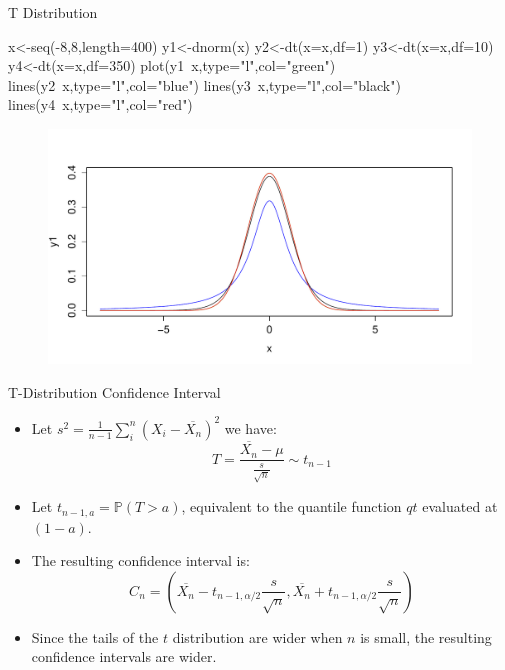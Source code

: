\documentclass[handout]{beamer}
\begin{document}
\begin{frame}[fragile]{T Distribution}
 \scriptsize{



\begin{verbatim*}
x<-seq(-8,8,length=400)
y1<-dnorm(x)
y2<-dt(x=x,df=1)
y3<-dt(x=x,df=10)
y4<-dt(x=x,df=350)
plot(y1~x,type="l",col="green")
lines(y2~x,type="l",col="blue")
lines(y3~x,type="l",col="black")
lines(y4~x,type="l",col="red")

\end{verbatim*}

 \begin{figure}[h!]
	\centering
	\includegraphics[scale=0.3]{pics/tstudent.pdf}
\end{figure}


}
\end{frame}


\begin{frame}{T-Distribution Confidence Interval}

\scriptsize{
\begin{itemize}
 \item Let  $s^{2}= \frac{1}{n-1} \sum_{i}^{n}(X_{i}-\overline{X_{n}})^2$ we have:
 \begin{displaymath}
  T=\frac{\overline{X_{n}}-\mu}{\frac{s}{\sqrt{n}}}\sim t_{n-1}
 \end{displaymath}
\item  Let $t_{n-1,a}=\mathbb{P}(T>a)$, equivalent to the quantile function $qt$ evaluated at $(1-a)$.
\item The resulting confidence interval is:
       \begin{displaymath}
 C_n = (\overline{X_{n}}-t_{n-1,\alpha/2}\frac{s}{\sqrt{n}} , \overline{X_{n}} + t_{n-1,\alpha/2}\frac{s}{\sqrt{n}}) 
 \end{displaymath} 
 \item Since the tails of the $t$ distribution are wider when $n$ is small, the resulting confidence intervals are wider.

\end{itemize}


}

\end{frame}
\end{document}

